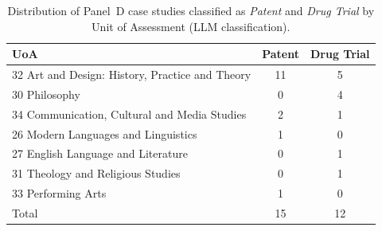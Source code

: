 \begin{table}[!ht]\centering
\caption{Distribution of Panel~D case studies classified as \textit{Patent} and \textit{Drug Trial} by Unit of Assessment (LLM classification).}
\label{tab:panelD_unusual_domains}
\small
\begin{tabular}{lcc}
\toprule
UoA & Patent & Drug Trial \\
\midrule
32 Art and Design: History, Practice and Theory & 11 & 5 \\
30 Philosophy & 0 & 4 \\
34 Communication, Cultural and Media Studies & 2 & 1 \\
26 Modern Languages and Linguistics & 1 & 0 \\
27 English Language and Literature & 0 & 1 \\
31 Theology and Religious Studies & 0 & 1 \\
33 Performing Arts & 1 & 0 \\
\midrule
Total & 15 & 12 \\
\bottomrule
\end{tabular}
\end{table}
